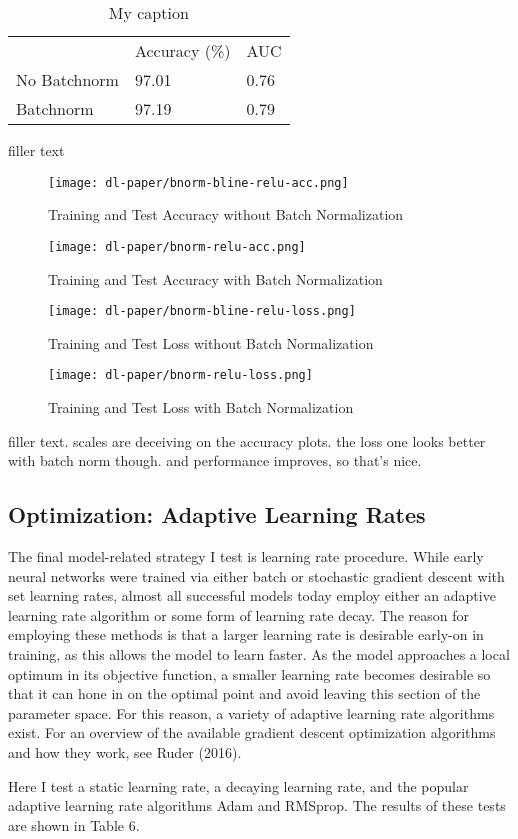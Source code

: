 \documentclass[12pt]{article}  %
\theoremstyle{definition}
\theoremstyle{remark}
\begin{document}
\begin{table}[]
\centering
\caption{My caption}
\label{my-label}
\begin{tabular}{lll}
             & Accuracy (\%) & AUC  \\
No Batchnorm & 97.01         & 0.76 \\
Batchnorm    & 97.19         & 0.79
\end{tabular}
\end{table}

\par filler text 

\begin{figure}[!htb]
  \texttt{[image: dl-paper/bnorm-bline-relu-acc.png]}
  \caption{Training and Test Accuracy without Batch Normalization}\label{no-bn-acc}
\endminipage\hfill
{}
  \texttt{[image: dl-paper/bnorm-relu-acc.png]}
  \caption{Training and Test Accuracy with Batch Normalization}\label{bn-acc}
\endminipage\hfill
\end{figure}

\begin{figure}[!htb]
  \texttt{[image: dl-paper/bnorm-bline-relu-loss.png]}
  \caption{Training and Test Loss without Batch Normalization}\label{no-bn-loss}
\endminipage\hfill
{}
  \texttt{[image: dl-paper/bnorm-relu-loss.png]}
  \caption{Training and Test Loss with Batch Normalization}\label{bn-loss}
\endminipage\hfill
\end{figure}

\par filler text. scales are deceiving on the accuracy plots. the loss one looks better with batch norm though. and performance improves, so that's nice. 

\subsection{Optimization: Adaptive Learning Rates}
\par The final model-related strategy I test is learning rate procedure. While early neural networks were trained via either batch or stochastic gradient descent with set learning rates, almost all successful models today employ either an adaptive learning rate algorithm or some form of learning rate decay. The reason for employing these methods is that a larger learning rate is desirable early-on in training, as this allows the model to learn faster. As the model approaches a local optimum in its objective function, a smaller learning rate becomes desirable so that it can hone in on the optimal point and avoid leaving this section of the parameter space. For this reason, a variety of adaptive learning rate algorithms exist. For an overview of the available gradient descent optimization algorithms and how they work, see Ruder (2016). 
\par Here I test a static learning rate, a decaying learning rate, and the popular adaptive learning rate algorithms Adam and RMSprop. The results of these tests are shown in Table 6. 
\end{document}
